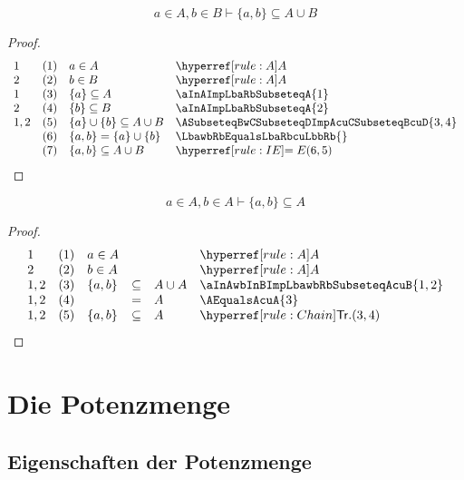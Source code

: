 \documentclass[main.tex]{subfiles}
\begin{document}
\begin{theorem}[ ]
\label{aInAwbInBImpLbawbRbSubseteqAcuB}
\[a\in A, b\in B\vdash \{a,b\}\subseteq A\cup B\]
\end{theorem}	
\begin{proof}
	\[
	\begin{array}{llll}
		1 & (1) & a\in A & \rA \\
		2 & (2) & b\in B & \rA \\
		1 & (3) & \{a\}\subseteq A & \aInAImpLbaRbSubseteqA{1} \\
		2 & (4) & \{b\}\subseteq B & \aInAImpLbaRbSubseteqA{2} \\
		1,2 & (5) & \{a\}\cup \{b\}\subseteq A\cup B & \ASubseteqBwCSubseteqDImpAcuCSubseteqBcuD{3,4} \\
		& (6) & \{a,b\} = \{a\}\cup \{b\}  & \LbawbRbEqualsLbaRbcuLbbRb{} \\
		& (7) & \{a,b\}\subseteq A\cup B & \rIE{6,5} \\
	\end{array}
	\]
\end{proof}

\begin{theorem}[ ]
\label{aInAwbInAImpLbawbRbSubseteqA}
\[a\in A, b\in A\vdash \{a,b\}\subseteq A\]
\end{theorem}	
\begin{proof}
	\[
	\begin{array}{lllcll}
		1 & (1) & a\in A & & & \rA \\
		2 & (2) & b\in A & & & \rA \\
        1,2 & (3) & \{a,b\}&\subseteq& A\cup A & \aInAwbInBImpLbawbRbSubseteqAcuB{1,2} \\
        1,2 & (4) & &=& A & \AEqualsAcuA{3} \\
        1,2 & (5) & \{a,b\} &\subseteq & A & \rChain{3,4} \\
	\end{array}
	\]
\end{proof}


\chapter{Die Potenzmenge}

\section{Eigenschaften der Potenzmenge}
\end{document}
